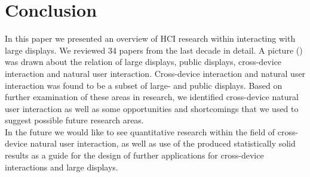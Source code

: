 \section{Conclusion}\label{Sec:Conclusion}
In this paper we presented an overview of HCI research within interacting with large displays. We reviewed 34 papers from the last decade in detail. A picture () was drawn about the relation of large displays, public displays, cross-device interaction and natural user interaction. Cross-device interaction and natural user interaction was found to be a subset of large- and public displays. Based on further examination of these areas in research, we identified cross-device natural user interaction as well as some opportunities and shortcomings that we used to suggest possible future research areas.\\
In the future we would like to see quantitative research within the field of cross-device natural user interaction, as well as use of the produced statistically solid results as a guide for the design of further applications for cross-device interactions and large displays.